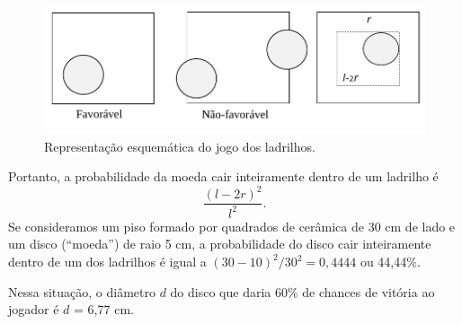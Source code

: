 \begin{frame}

\begin{figure}[!htb]
\begin{center}
\includegraphics[angle=0, scale=0.5]{fig7.pdf}
\end{center}
\caption{\label{fig7} Representação esquemática do jogo dos ladrilhos.
}
\end{figure} 
  Portanto, a probabilidade da moeda cair inteiramente
dentro de um ladrilho é $$ \frac{( l-2r )^2}{l^2}.$$
Se consideramos um piso formado por quadrados de cerâmica de 30 cm de lado e um disco (``moeda'') de raio 5 cm, a probabilidade do disco cair inteiramente dentro de um dos ladrilhos é igual a $(30-10)^2/ 30^2 = 0,4444$ ou 44,44\%.


Nessa situação, o diâmetro $d$ do disco que daria 60\% de chances de vitória ao jogador é $d$ = 6,77 cm.
\end{frame}
